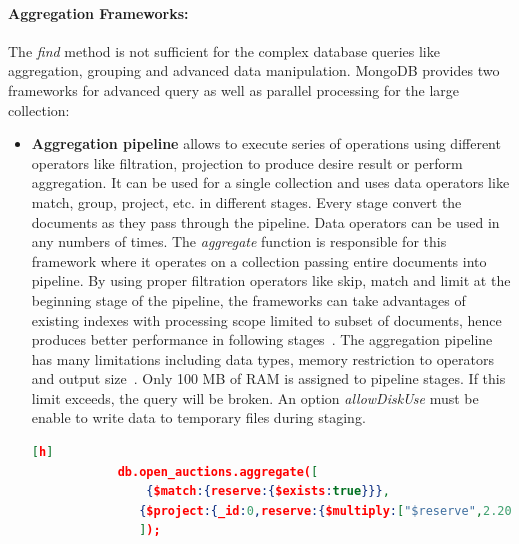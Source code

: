 \paragraph{Aggregation Frameworks:}
 The \textit{find} method is not sufficient for the complex database queries like aggregation, grouping  and advanced data manipulation. MongoDB provides two frameworks for advanced query as well as parallel processing for the large collection:
 \begin{itemize}
		\item{ \textbf{Aggregation pipeline}} allows to execute series of operations using different operators like filtration, projection to produce desire result or perform aggregation.  It can be used for a single collection and uses  data operators like match, group, project, etc. in different stages. Every stage convert the documents as they pass through the pipeline. Data operators can be used  in any numbers of times.  The \textit{aggregate} function is responsible for this framework where it operates on a collection passing  entire documents into pipeline. By using proper filtration operators like  skip, match and limit at the beginning  stage of the pipeline,  the frameworks can take advantages of existing indexes with processing scope limited to subset of documents, hence produces better performance in following stages~\cite{mongodbaggregation}. The aggregation pipeline has many limitations including data types, memory restriction to operators and output size~\cite{nosql/comparision}. Only 100 MB of RAM is assigned to pipeline stages. If this limit exceeds, the query will be broken. An option \textit{allowDiskUse} must be enable to write data to temporary files during staging.
		
				   \begin{lstlisting}[language=JSON,caption=An example Aggregation pipeline in MongoDB, label=mongodb-aggregation-pipeline, basicstyle = \scriptsize][h]
            db.open_auctions.aggregate([
                {$match:{reserve:{$exists:true}}},
		       {$project:{_id:0,reserve:{$multiply:["$reserve",2.20371]}}}
		       ]);
		  \end{lstlisting}
		  

\end{itemize}
